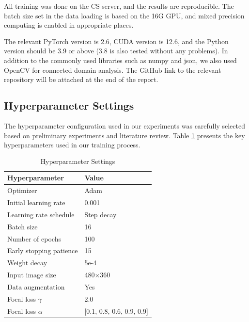 \documentclass[conference]{IEEEtran}
\begin{document}

All training was done on the CS server, and the results are reproducible. The batch size set in the data loading is based on the 16G GPU, and mixed precision computing is enabled in appropriate places.

The relevant PyTorch version is 2.6, CUDA version is 12.6, and the Python version should be 3.9 or above (3.8 is also tested without any problems). In addition to the commonly used libraries such as numpy and json, we also used OpenCV for connected domain analysis. The GitHub link to the relevant repository will be attached at the end of the report.



\subsection{Hyperparameter Settings}


The hyperparameter configuration used in our experiments was carefully selected based on preliminary experiments and literature review. Table \ref{tab:hyperparams} presents the key hyperparameters used in our training process.

\begin{table}[htbp]
    \caption{Hyperparameter Settings}
    \label{tab:hyperparams}
    \centering
    \begin{tabular}{ll}
    \hline
    \textbf{Hyperparameter} & \textbf{Value} \\
    \hline
    Optimizer & Adam \\
    Initial learning rate & 0.001 \\
    Learning rate schedule & Step decay \\
    Batch size & 16 \\
    Number of epochs & 100 \\
    Early stopping patience & 15 \\
    Weight decay & 5e-4 \\
    Input image size & 480×360 \\
    Data augmentation & Yes \\
    Focal loss $\gamma$ & 2.0 \\
    Focal loss $\alpha$ & [0.1, 0.8, 0.6, 0.9, 0.9] \\
    \hline
    \end{tabular}
    \end{table}
\end{document}
